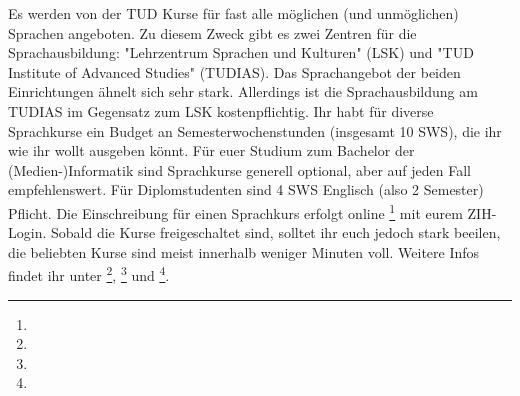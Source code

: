 Es werden von der TUD Kurse für fast alle möglichen (und unmöglichen) Sprachen angeboten.
Zu diesem Zweck gibt es zwei Zentren für die Sprachausbildung: "Lehrzentrum Sprachen und Kulturen" (LSK) und "TUD Institute of Advanced Studies" (TUDIAS).
Das Sprachangebot der beiden Einrichtungen ähnelt sich sehr stark. Allerdings ist die Sprachausbildung am TUDIAS im Gegensatz zum LSK kostenpflichtig.
Ihr habt für diverse Sprachkurse ein Budget an Semesterwochenstunden (insgesamt 10 SWS), die ihr wie ihr wollt ausgeben könnt.
Für euer Studium zum Bachelor der (Medien-)Informatik sind Sprachkurse generell optional, aber auf jeden Fall empfehlenswert.
Für Diplomstudenten sind 4 SWS Englisch (also 2 Semester) Pflicht.
Die Einschreibung für einen Sprachkurs erfolgt online \footnote{} mit eurem ZIH-Login.
Sobald die Kurse freigeschaltet sind, solltet ihr euch jedoch stark beeilen, die beliebten Kurse sind meist innerhalb weniger Minuten voll.
Weitere Infos findet ihr unter \footnote{}, \footnote{} und \footnote{}.